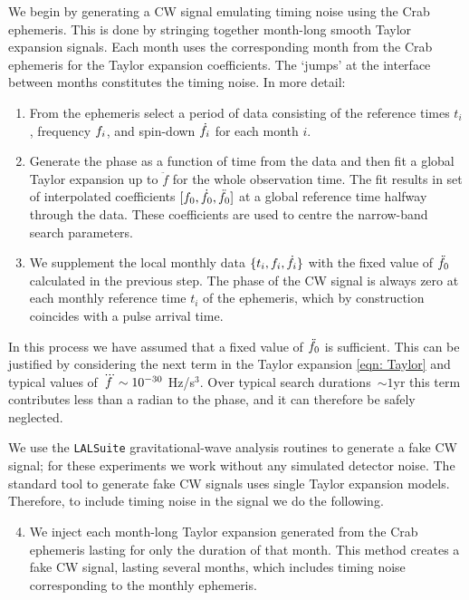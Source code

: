 \documentclass[../full_thesis/full_thesis.tex]{subfiles}
\begin{document}
We begin by generating a CW signal emulating timing noise using the Crab
ephemeris. This is done by stringing together month-long smooth Taylor expansion
signals. Each month uses the corresponding month from the Crab
ephemeris for the Taylor expansion coefficients. The `jumps' at the interface
between months constitutes the timing noise.
In more detail:
\begin{enumerate}

\item From the ephemeris select a period of data consisting of the reference
times $t_i$, frequency $f_i$, and spin-down
$\dot{f}_i$ for each month $i$.

\item \label{fit} Generate the phase as a function of time from the data and
then fit a global Taylor expansion up to $\ddot{f}$ for the whole
observation time.  The fit results in set of interpolated coefficients
$[f_{0}, \dot{f}_{0}, \ddot{f}_{0}]$ at a global reference time halfway through
the data. These coefficients are used to centre the narrow-band search
parameters.

\item We supplement the local monthly data $\{t_i, f_{i}, \dot{f}_{i}\}$ with
the fixed value of $\ddot{f}_{0}$ calculated in the previous step. The phase of
the CW signal is always zero at each monthly reference time $t_i$ of the
ephemeris, which by construction coincides with a pulse arrival time.

\end{enumerate}

In this process we have assumed that a fixed value of $\ddot{f}_{0}$ is
sufficient. This can be justified by considering the next term in the Taylor
expansion \eqref{eqn: Taylor} and typical values of $\dddot{f} \sim 10^{-30}$
Hz/s$^{3}$.  Over typical search durations~$\sim 1$yr this term contributes
less than a radian to the phase, and it can therefore be safely neglected.

We use the \verb+LALSuite+ \cite{lalsuite} gravitational-wave analysis routines
to generate a fake CW signal; for these experiments we work
without any simulated detector noise. The standard tool to generate fake CW
signals uses single Taylor expansion models. Therefore, to include timing noise
in the signal we do the following.

\begin{enumerate}
\setcounter{enumi}{3}

\item We inject each month-long Taylor expansion generated from the Crab ephemeris
lasting for only the duration of that month.
This
method creates a fake CW signal, lasting several months, which includes timing noise corresponding to the monthly
ephemeris.

\end{enumerate}
\end{document}
